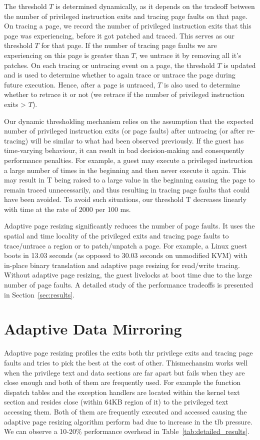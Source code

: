 The threshold $T$ is determined dynamically, as it depends on the tradeoff between the number of privileged instruction exits and tracing  page faults on that page. On tracing a page, we record the number of privileged instruction exits that this page was experiencing, before it got patched and traced. This serves as our threshold $T$ for that page. If the number of tracing page faults we are experiencing on this page is greater than $T$, we untrace it by removing all it's patches. On each tracing or untracing event on a page, the threshold $T$ is updated and is used to determine whether to again trace or untrace the page during future execution. Hence, after a page is untraced, $T$ is also used to determine whether to retrace it or not (we retrace if the number of privileged instruction exits > $T$).

Our dynamic thresholding mechanism relies on the assumption that the expected number of privileged instruction exits (or page faults) after  untracing (or after re-tracing) will be similar to what had been observed previously. If the guest has time-varying behaviour, it can result in bad decision-making and consequently performance penalties. For example, a guest may execute a privileged instruction a large number of times in the beginning and then never execute it again. This may result in T being raised to a large value in the beginning causing the page to remain traced unnecessarily, and thus resulting in tracing page faults that could have been avoided. To avoid such situations, our threshold T decreases linearly with time at the rate of 2000 per 100 ms. 

Adaptive page resizing significantly reduces the number of page faults. It uses the spatial and time locality of the privileged exits and tracing page faults to trace/untrace a region or to patch/unpatch a page. For example, a Linux guest boots in 13.03 seconds (as opposed to 30.03 seconds on unmodified KVM) with in-place binary translation and adaptive page resizing for read/write tracing. Without adaptive page resizing, the guest livelocks at boot time due to the large number of page faults. A detailed study of the performance tradeoffs is presented in Section~\ref{sec:results}.

\section{Adaptive Data Mirroring}
\label{adaptive_dm}
Adaptive page resizing profiles the exits both thr privilege exits and tracing page faults and tries to pick the best at the cost of other. Thismechansim works well when the privilege text and data sections are far apart but fails when they are close enough and both of them are frequently used. For example the function dispatch tables and the exception handlers are located within the kernel text section and resides close (within 64KB region of it) to the privileged text accessing them. Both of them are frequently executed and accessed causing the adaptive page resizing algorithm perform bad due to increase in the tlb pressure. We can observe a 10-20\% performance overhead in Table~\ref{tab:detailed_results}. 

